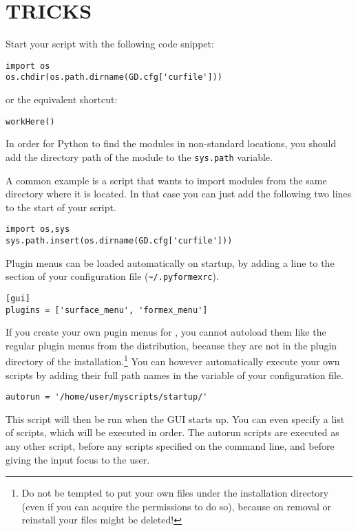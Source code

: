 \section{TRICKS}
\label{sec:tricks}

\begin{enumerate}
Start your script with the following code snippet:
\begin{verbatim}
import os
os.chdir(os.path.dirname(GD.cfg['curfile']))
\end{verbatim}
or the equivalent shortcut:
\begin{verbatim}
workHere()
\end{verbatim}

In order for Python to find the modules in non-standard locations, you should add the directory path of the module to the \verb|sys.path| variable. 

A common example is a script that wants to import modules from the same directory where it is located. In that case you can just add the following two lines to the start of your script.
\begin{verbatim}
import os,sys
sys.path.insert(os.dirname(GD.cfg['curfile']))
\end{verbatim}

Plugin menus can be loaded automatically on \pyformex startup, by adding a line to the  section of your configuration file (\verb|~/.pyformexrc|).
\begin{verbatim}
[gui]
plugins = ['surface_menu', 'formex_menu']
\end{verbatim}

If you create your own pugin menus for \pyformex, you cannot autoload them like the regular plugin menus from the distribution, because they are not in the plugin directory of the installation.\footnote{Do not be tempted to put your own files under the installation directory (even if you can acquire the permissions to do so), because on removal or reinstall your files might be deleted!}
You can however automatically execute your own scripts by adding their full path names in the  variable of your configuration file.
\begin{verbatim}
autorun = '/home/user/myscripts/startup/'
\end{verbatim}
This script will then be run when the \pyformex GUI starts up. You can even specify a list of scripts, which will be executed in order.
The autorun scripts are executed as any other \pyformex script, before any scripts specified on the command line, and before giving the input focus to the user.


\end{enumerate}

